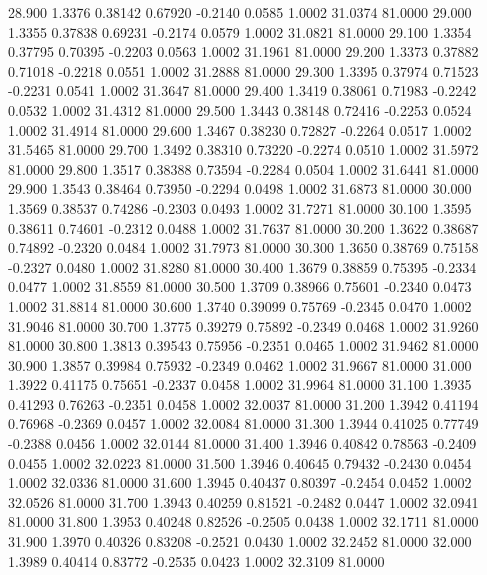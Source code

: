   28.900   1.3376   0.38142   0.67920  -0.2140   0.0585   1.0002  31.0374  81.0000
  29.000   1.3355   0.37838   0.69231  -0.2174   0.0579   1.0002  31.0821  81.0000
  29.100   1.3354   0.37795   0.70395  -0.2203   0.0563   1.0002  31.1961  81.0000
  29.200   1.3373   0.37882   0.71018  -0.2218   0.0551   1.0002  31.2888  81.0000
  29.300   1.3395   0.37974   0.71523  -0.2231   0.0541   1.0002  31.3647  81.0000
  29.400   1.3419   0.38061   0.71983  -0.2242   0.0532   1.0002  31.4312  81.0000
  29.500   1.3443   0.38148   0.72416  -0.2253   0.0524   1.0002  31.4914  81.0000
  29.600   1.3467   0.38230   0.72827  -0.2264   0.0517   1.0002  31.5465  81.0000
  29.700   1.3492   0.38310   0.73220  -0.2274   0.0510   1.0002  31.5972  81.0000
  29.800   1.3517   0.38388   0.73594  -0.2284   0.0504   1.0002  31.6441  81.0000
  29.900   1.3543   0.38464   0.73950  -0.2294   0.0498   1.0002  31.6873  81.0000
  30.000   1.3569   0.38537   0.74286  -0.2303   0.0493   1.0002  31.7271  81.0000
  30.100   1.3595   0.38611   0.74601  -0.2312   0.0488   1.0002  31.7637  81.0000
  30.200   1.3622   0.38687   0.74892  -0.2320   0.0484   1.0002  31.7973  81.0000
  30.300   1.3650   0.38769   0.75158  -0.2327   0.0480   1.0002  31.8280  81.0000
  30.400   1.3679   0.38859   0.75395  -0.2334   0.0477   1.0002  31.8559  81.0000
  30.500   1.3709   0.38966   0.75601  -0.2340   0.0473   1.0002  31.8814  81.0000
  30.600   1.3740   0.39099   0.75769  -0.2345   0.0470   1.0002  31.9046  81.0000
  30.700   1.3775   0.39279   0.75892  -0.2349   0.0468   1.0002  31.9260  81.0000
  30.800   1.3813   0.39543   0.75956  -0.2351   0.0465   1.0002  31.9462  81.0000
  30.900   1.3857   0.39984   0.75932  -0.2349   0.0462   1.0002  31.9667  81.0000
  31.000   1.3922   0.41175   0.75651  -0.2337   0.0458   1.0002  31.9964  81.0000
  31.100   1.3935   0.41293   0.76263  -0.2351   0.0458   1.0002  32.0037  81.0000
  31.200   1.3942   0.41194   0.76968  -0.2369   0.0457   1.0002  32.0084  81.0000
  31.300   1.3944   0.41025   0.77749  -0.2388   0.0456   1.0002  32.0144  81.0000
  31.400   1.3946   0.40842   0.78563  -0.2409   0.0455   1.0002  32.0223  81.0000
  31.500   1.3946   0.40645   0.79432  -0.2430   0.0454   1.0002  32.0336  81.0000
  31.600   1.3945   0.40437   0.80397  -0.2454   0.0452   1.0002  32.0526  81.0000
  31.700   1.3943   0.40259   0.81521  -0.2482   0.0447   1.0002  32.0941  81.0000
  31.800   1.3953   0.40248   0.82526  -0.2505   0.0438   1.0002  32.1711  81.0000
  31.900   1.3970   0.40326   0.83208  -0.2521   0.0430   1.0002  32.2452  81.0000
  32.000   1.3989   0.40414   0.83772  -0.2535   0.0423   1.0002  32.3109  81.0000
